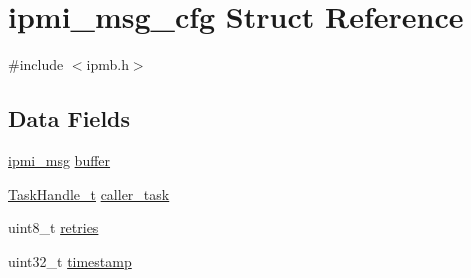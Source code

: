 \hypertarget{structipmi__msg__cfg}{\section{ipmi\-\_\-msg\-\_\-cfg Struct Reference}
\label{structipmi__msg__cfg}
}


{\ttfamily \#include $<$ipmb.\-h$>$}

\subsection*{Data Fields}
\begin{DoxyCompactItemize}
\item 
\hyperlink{structipmi__msg}{ipmi\-\_\-msg} \hyperlink{structipmi__msg__cfg_a87e003a735fb94cbba3f6fae2c818d73}{buffer}
\item 
\hyperlink{task_8h_ae95f44d4cfeb4a599c6cc258d241cb6b}{Task\-Handle\-\_\-t} \hyperlink{structipmi__msg__cfg_a4abb25bcfeca6a90de727455ffc34547}{caller\-\_\-task}
\item 
uint8\-\_\-t \hyperlink{structipmi__msg__cfg_a1eb8c7427ffd1b308c05a0df8baed6fb}{retries}
\item 
uint32\-\_\-t \hyperlink{structipmi__msg__cfg_af6950ff8da9cb798d67299557d311545}{timestamp}
\end{DoxyCompactItemize}


